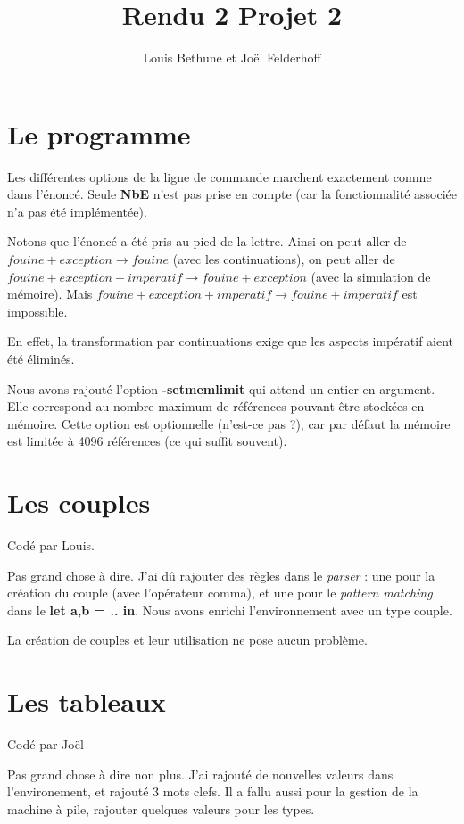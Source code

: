 \documentclass[a4paper,10pt]{report}
\title{Rendu 2 Projet 2}
\author{Louis Bethune et Jo\"el Felderhoff}
\date{}
\begin{document}
\maketitle

\section{Le programme}

Les différentes options de la ligne de commande marchent exactement comme dans l'énoncé. Seule \textbf{NbE} n'est pas prise en compte (car la fonctionnalité associée n'a pas été implémentée).

Notons que l'énoncé a été pris au pied de la lettre. Ainsi on peut aller de $fouine + exception \rightarrow fouine$ (avec les continuations), on peut aller de $fouine + exception + imperatif \rightarrow fouine + exception$ (avec la simulation de mémoire). Mais $fouine + exception + imperatif \rightarrow fouine + imperatif$ est impossible.  
  
En effet, la transformation par continuations exige que les aspects impératif aient été éliminés.  
  
Nous avons rajouté l'option \textbf{-setmemlimit} qui attend un entier en argument. Elle correspond au nombre maximum de références pouvant être stockées en mémoire. Cette option est optionnelle (n'est-ce pas ?), car par défaut la mémoire est limitée à 4096 références (ce qui suffit souvent).   
  
\section{Les couples}

Codé par Louis.  
  
Pas grand chose à dire. J'ai dû rajouter des règles dans le \textit{parser} : une pour la création du couple (avec l'opérateur comma), et une pour le \textit{pattern matching} dans le \textbf{let a,b  = .. in}. Nous avons enrichi l'environnement avec un type couple.  
  
La création de couples et leur utilisation ne pose aucun problème.  
  
\section{Les tableaux}

Codé par Joël

Pas grand chose à dire non plus. J'ai rajouté de nouvelles valeurs dans l'environement, et rajouté 3 mots clefs. Il a fallu aussi pour la gestion de la machine à pile, rajouter quelques valeurs pour les types.
\end{document}
